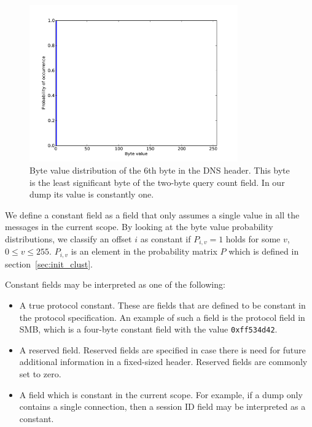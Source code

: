\documentclass[a4paper]{report}
\begin{document}
\begin{figure}[h]
    \centering
    \includegraphics[width=0.8\textwidth]{const_one}
    \captionsetup{width=0.8\textwidth}
    \caption{Byte value distribution of the 6th byte in the DNS header. This
        byte is the least significant byte of the two-byte query count field.
        In our dump its value is constantly one.}
    \label{fig:const_one}
\end{figure}

We define a constant field as a field that only assumes a single value in all
the messages in the current scope. By looking at the byte value probability
distributions, we classify an offset $i$ as constant if $P_{i,v} = 1$ holds for
some $v$, $0 \le v \le 255$. $P_{i,v}$ is an element in the probability
matrix $P$ which is defined in section~\ref{sec:init_clust}.

Constant fields may be interpreted as one of the following:
\begin{itemize}
    \item A true protocol constant. These are fields that are defined to be
        constant in the protocol specification. An example of such a field is
        the protocol field in SMB, which is a four-byte constant field with
        the value \verb+0xff534d42+.
    \item A reserved field. Reserved fields are specified in case there is need
        for future additional information in a fixed-sized header. Reserved
        fields are commonly set to zero.
    \item A field which is constant in the current scope. For example, if a dump
        only contains a single connection, then a session ID field may be
        interpreted as a constant. 
\end{itemize}
\end{document}
